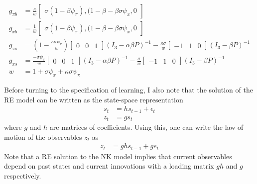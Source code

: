 \documentclass[11pt]{article}
\renewcommand{\[}{\begin{equation}}
\renewcommand{\]}{\end{equation}}
\begin{document}
\begin{align}
g_{\pi b} & = \frac{\kappa}{w} \begin{bmatrix}\sigma(1-\beta\psi_{\pi}), (1-\beta-\beta\sigma\psi_x, 0 \end{bmatrix}\\
g_{x b} & = \frac{1}{w} \begin{bmatrix}\sigma(1-\beta\psi_{\pi}), (1-\beta-\beta\sigma\psi_x, 0 \end{bmatrix} \\
g_{\pi s} & = (1-\frac{\kappa\sigma\psi_{\pi}}{w} )\begin{bmatrix} 0&0&1 \end{bmatrix} (I_3 - \alpha\beta P)^{-1} -\frac{\kappa\sigma}{w}\begin{bmatrix} -1&1&0 \end{bmatrix} (I_3 -\beta P)^{-1}\\
g_{x s} & =  \frac{-\sigma\psi_{\pi}}{w} \begin{bmatrix} 0&0&1 \end{bmatrix}(I_3 - \alpha\beta P)^{-1}  -\frac{\sigma}{w}\begin{bmatrix} -1&1&0 \end{bmatrix}(I_3 -\beta P)^{-1}\\
w & = 1+\sigma\psi_x +\kappa\sigma\psi_{\pi}
\end{align}

Before turning to the specification of learning, I also note that the solution of the RE model can be written as the state-space representation \begin{align}
s_{t} & = h s_{t-1} +  \epsilon_t \label{state_eq}\\
z_t & = g  s_t \label{obs_eq}
\end{align}
where $g$ and $h$ are matrices of coefficients. Using this, one can write the law of motion of the observables $z_t$ as
\begin{align}
z_t & = g  h s_{t-1} + g  e_t  \label{ALM_RE}
\end{align}
Note that a RE solution to the NK model implies that current observables depend on past states and current innovations with a loading matrix $gh$ and $g$ respectively.  
\end{document}

